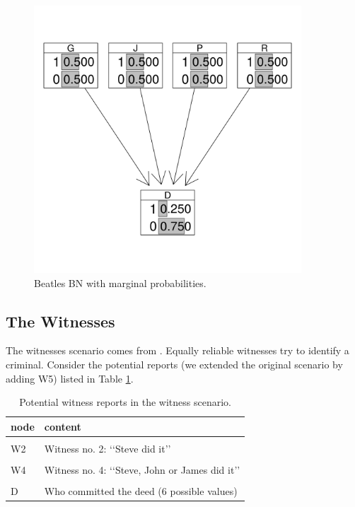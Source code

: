 \documentclass[10pt,]{scrartcl}
\newcommand{\s}[1]{\mbox{\textsf{#1}}}
\begin{document}
\begin{figure}[H]
\centering
\includegraphics[width =10cm]{../images/BeatlesBN.png}
\caption{Beatles BN with marginal probabilities.}
\label{fig:BeatlesBN3}
\end{figure}




\subsection{The Witnesses}

The witnesses scenario  comes from \citep[391]{olsson2005}. Equally reliable witnesses try to identify a criminal. Consider the
 potential reports (we extended the original scenario by adding \s{W5}) listed in Table \ref{tab:witRep}. 

\begin{table}[H]
\centering
\begin{tabular}{ll}
\toprule
node & content\\
\midrule
\cellcolor{gray!6}{W1} & \cellcolor{gray!6}{Witness no. 1: ‘‘Steve did it’’}\\
W2 & Witness no. 2: ‘‘Steve did it’’\\
\cellcolor{gray!6}{W3} & \cellcolor{gray!6}{Witness no. 3: ‘‘Steve, Martin or David did it’’}\\
W4 & Witness no. 4: ‘‘Steve, John or James did it’’\\
\cellcolor{gray!6}{W5} & \cellcolor{gray!6}{Wittness no. 5: ‘‘Steve, John or Peter did it’’}\\
D & Who committed the deed (6  possible values)\\
\bottomrule
\end{tabular}
\caption{Potential witness reports in the witness scenario.}
\label{tab:witRep}
\end{table}
\end{document}
